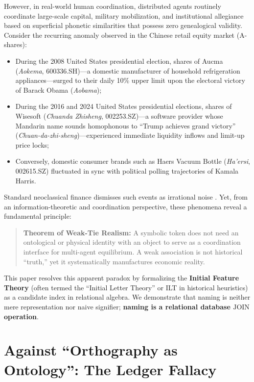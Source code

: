 \documentclass[11pt,a4paper]{article}
\begin{document}
However, in real-world human coordination, distributed agents routinely coordinate large-scale capital, military mobilization, and institutional allegiance based on superficial phonetic similarities that possess zero genealogical validity. Consider the recurring anomaly observed in the Chinese retail equity market (A-shares):
\begin{itemize}
    \item During the 2008 United States presidential election, shares of Aucma (\textit{Aokema}, 600336.SH)—a domestic manufacturer of household refrigeration appliances—surged to their daily 10\% upper limit upon the electoral victory of Barack Obama (\textit{Aobama});
    \item During the 2016 and 2024 United States presidential elections, shares of Wisesoft (\textit{Chuanda Zhisheng}, 002253.SZ)—a software provider whose Mandarin name sounds homophonous to ``Trump achieves grand victory'' (\textit{Chuan-da-zhi-sheng})—experienced immediate liquidity inflows and limit-up price locks;
    \item Conversely, domestic consumer brands such as Haers Vacuum Bottle (\textit{Ha'ersi}, 002615.SZ) fluctuated in sync with political polling trajectories of Kamala Harris.
\end{itemize}

Standard neoclassical finance \cite{fama1970efficient} dismisses such events as irrational noise \cite{shiller2000irrational, barber2009systematic}. Yet, from an information-theoretic and coordination perspective, these phenomena reveal a fundamental principle:
\begin{quote}
\textbf{Theorem of Weak-Tie Realism:} A symbolic token does not need an ontological or physical identity with an object to serve as a coordination interface for multi-agent equilibrium. A weak association is not historical ``truth,'' yet it systematically manufactures economic reality.
\end{quote}

This paper resolves this apparent paradox by formalizing the \textbf{Initial Feature Theory} (often termed the ``Initial Letter Theory'' or ILT in historical heuristics) as a candidate index in relational algebra. We demonstrate that naming is neither mere representation nor naive signifier; \textbf{naming is a relational database $\text{JOIN}$ operation}.

\section{Against ``Orthography as Ontology'': The Ledger Fallacy}
\end{document}
